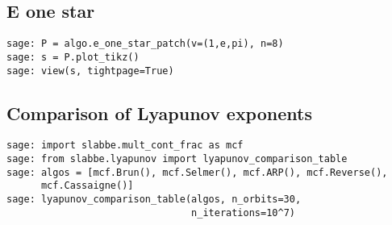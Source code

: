 \subsection{E one star}
\begin{verbatim}
sage: P = algo.e_one_star_patch(v=(1,e,pi), n=8)
sage: s = P.plot_tikz()
sage: view(s, tightpage=True)
\end{verbatim}
\subsection{Comparison of Lyapunov exponents}
\begin{verbatim}
sage: import slabbe.mult_cont_frac as mcf
sage: from slabbe.lyapunov import lyapunov_comparison_table
sage: algos = [mcf.Brun(), mcf.Selmer(), mcf.ARP(), mcf.Reverse(),
      mcf.Cassaigne()]
sage: lyapunov_comparison_table(algos, n_orbits=30, 
                                n_iterations=10^7)
\end{verbatim}
